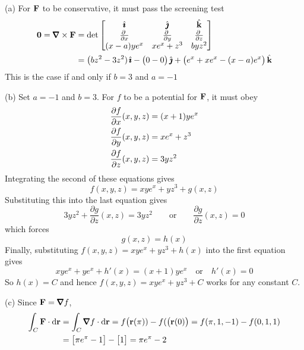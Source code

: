 \begin{solution} (a) For $\mathbf{F}$ to be conservative, it must pass
the screening test
\begin{align*}
\vZero = \vnabla\times\vF
&=\det\left[\begin{matrix}
\hi &\hj &\hk \\
\pdiff{}{x} & \pdiff{}{y} & 
                \pdiff{}{z} \\
(x - a)ye^x & xe^x + z^3 & byz^2
\end{matrix}
\right] \\
&= \big(bz^2-3z^2)\,\hi -\big(0-0\big)\,\hj +\big(e^x+xe^x-(x-a)e^x\big)\,\hk
\end{align*}
This is the case if and only if $b=3$ and $a=-1$

(b) Set $a=-1$ and $b=3$. For $f$ to be a potential for $\mathbf{F}$,
it must obey
\begin{align*}
\pdiff{f}{x}(x,y,z) 
            &= (x + 1)ye^x \\
\pdiff{f}{y}(x,y,z) &= xe^x + z^3 \\
\pdiff{f}{z}(x,y,z) &= 3yz^2
\end{align*}
Integrating the second of these equations gives
\begin{equation*}
f(x,y,z) = xye^x + yz^3 +g(x,z)
\end{equation*}
Substituting this into the last equation gives 
\begin{equation*}
3yz^2+\frac{\partial g}{\partial z}(x,z) = 3yz^2\qquad\text{or}\qquad
\frac{\partial g}{\partial z}(x,z)=0
\end{equation*}
which forces
\begin{equation*}
g(x,z) =  h(x)
\end{equation*}
Finally, substituting $f(x,y,z) = xye^x + yz^3 + h(x)$
into the first equation gives
\begin{equation*}
xye^x + ye^x + h'(x)
=(x + 1)ye^x \quad\text{or}\quad
h'(x) = 0
\end{equation*}
So $h(x) = C$ and hence $f(x,y,z) = xye^x + yz^3 + C$  
works for any constant $C$.

(c) Since $\vF=\vnabla f$,
\begin{align*}
\int_C\vF\cdot\dee{\vr}
&=\int_C\vnabla f\cdot\dee{\vr}
=f\big(\vr(\pi)) - f(\big(\vr(0)\big)
=f(\pi,1,-1)-f(0,1,1) \\
&=\big[\pi e^\pi -1 \big]-\big[ 1\big]
=\pi e^\pi-2
\end{align*}


\end{solution}
